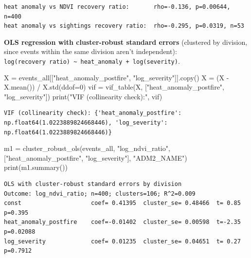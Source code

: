\documentclass[
  letterpaper,
  DIV=11,
  numbers=noendperiod]{scrartcl}
\newenvironment{Shaded}{\begin{snugshade}}{\end{snugshade}}
\newcommand{\BuiltInTok}[1]{\textcolor[rgb]{0.00,0.23,0.31}{#1}}
\newcommand{\DecValTok}[1]{\textcolor[rgb]{0.68,0.00,0.00}{#1}}
\newcommand{\NormalTok}[1]{\textcolor[rgb]{0.00,0.23,0.31}{#1}}
\newcommand{\OperatorTok}[1]{\textcolor[rgb]{0.37,0.37,0.37}{#1}}
\newcommand{\StringTok}[1]{\textcolor[rgb]{0.13,0.47,0.30}{#1}}
\begin{document}
\begin{verbatim}
heat anomaly vs NDVI recovery ratio:       rho=-0.136, p=0.00644, n=400
heat anomaly vs sightings recovery ratio:  rho=-0.295, p=0.0319, n=53
\end{verbatim}

\textbf{OLS regression with cluster-robust standard errors} (clustered
by division, since events within the same division aren't independent):
\texttt{log(recovery\ ratio)\ \textasciitilde{}\ heat\_anomaly\ +\ log(severity)}.

\begin{Shaded}
\begin{Highlighting}[]
\NormalTok{X }\OperatorTok{=}\NormalTok{ events\_all[[}\StringTok{"heat\_anomaly\_postfire"}\NormalTok{, }\StringTok{"log\_severity"}\NormalTok{]].copy()}
\NormalTok{X }\OperatorTok{=}\NormalTok{ (X }\OperatorTok{{-}}\NormalTok{ X.mean()) }\OperatorTok{/}\NormalTok{ X.std(ddof}\OperatorTok{=}\DecValTok{0}\NormalTok{)}
\NormalTok{vif }\OperatorTok{=}\NormalTok{ vif\_table(X, [}\StringTok{"heat\_anomaly\_postfire"}\NormalTok{, }\StringTok{"log\_severity"}\NormalTok{])}
\BuiltInTok{print}\NormalTok{(}\StringTok{"VIF (collinearity check):"}\NormalTok{, vif)}
\end{Highlighting}
\end{Shaded}

\begin{verbatim}
VIF (collinearity check): {'heat_anomaly_postfire': np.float64(1.0223889824668446), 'log_severity': np.float64(1.0223889824668446)}
\end{verbatim}

\begin{Shaded}
\begin{Highlighting}[]
\NormalTok{m1 }\OperatorTok{=}\NormalTok{ cluster\_robust\_ols(events\_all, }\StringTok{"log\_ndvi\_ratio"}\NormalTok{,}
\NormalTok{                        [}\StringTok{"heat\_anomaly\_postfire"}\NormalTok{, }\StringTok{"log\_severity"}\NormalTok{], }\StringTok{"ADM2\_NAME"}\NormalTok{)}
\BuiltInTok{print}\NormalTok{(m1.summary())}
\end{Highlighting}
\end{Shaded}

\begin{verbatim}
OLS with cluster-robust standard errors by division
Outcome: log_ndvi_ratio; n=400; clusters=106; R^2=0.009
const                    coef= 0.41395  cluster_se= 0.48466  t= 0.85  p=0.395
heat_anomaly_postfire    coef=-0.01402  cluster_se= 0.00598  t=-2.35  p=0.02088
log_severity             coef= 0.01235  cluster_se= 0.04651  t= 0.27  p=0.7912
\end{verbatim}
\end{document}

